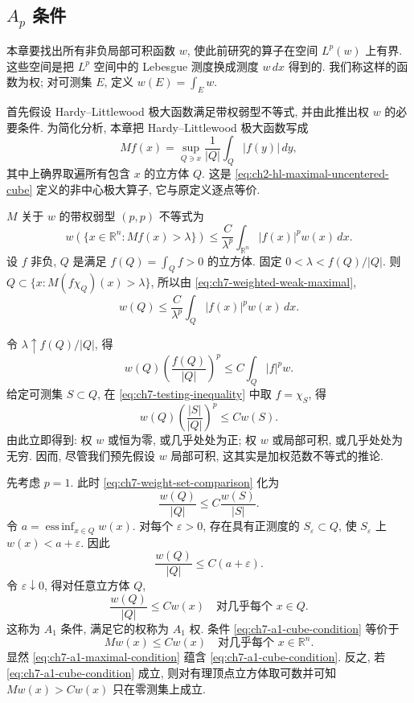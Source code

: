 \hypertarget{chapter-07-page-145}{}
\subsection{$A_p$ 条件}
\label{sec:ch7-ap-condition}

本章要找出所有非负局部可积函数 $w$, 使此前研究的算子在空间 $L^p(w)$ 上有界. 这些空间是把 $L^p$ 空间中的 Lebesgue 测度换成测度 $w\,dx$ 得到的. 我们称这样的函数为权; 对可测集 $E$, 定义 $w(E)=\int_Ew$.

首先假设 Hardy--Littlewood 极大函数满足带权弱型不等式, 并由此推出权 $w$ 的必要条件. 为简化分析, 本章把 Hardy--Littlewood 极大函数写成
\[
 Mf(x)=\sup_{Q\ni x}\frac1{|Q|}\int_Q|f(y)|\,dy,
\]
其中上确界取遍所有包含 $x$ 的立方体 $Q$. 这是 \eqref{eq:ch2-hl-maximal-uncentered-cube} 定义的非中心极大算子, 它与原定义逐点等价.

$M$ 关于 $w$ 的带权弱型 $(p,p)$ 不等式为
\begin{equation}
\label{eq:ch7-weighted-weak-maximal}
 w(\{x\in\mathbb R^n:Mf(x)>\lambda\})
 \le\frac C{\lambda^p}\int_{\mathbb R^n}|f(x)|^pw(x)\,dx.
\end{equation}
设 $f$ 非负, $Q$ 是满足 $f(Q)=\int_Qf>0$ 的立方体. 固定 $0<\lambda<f(Q)/|Q|$. 则 $Q\subset\{x:M(f\chi_Q)(x)>\lambda\}$, 所以由 \eqref{eq:ch7-weighted-weak-maximal},
\[
 w(Q)\le\frac C{\lambda^p}\int_Q|f(x)|^pw(x)\,dx.
\]

\hypertarget{chapter-07-page-146}{}
令 $\lambda\uparrow f(Q)/|Q|$, 得
\begin{equation}
\label{eq:ch7-testing-inequality}
 w(Q)\left(\frac{f(Q)}{|Q|}\right)^p
 \le C\int_Q|f|^pw.
\end{equation}
给定可测集 $S\subset Q$, 在 \eqref{eq:ch7-testing-inequality} 中取 $f=\chi_S$, 得
\begin{equation}
\label{eq:ch7-weight-set-comparison}
 w(Q)\left(\frac{|S|}{|Q|}\right)^p\le Cw(S).
\end{equation}
由此立即得到: 权 $w$ 或恒为零, 或几乎处处为正; 权 $w$ 或局部可积, 或几乎处处为无穷. 因而, 尽管我们预先假设 $w$ 局部可积, 这其实是加权范数不等式的推论.

先考虑 $p=1$. 此时 \eqref{eq:ch7-weight-set-comparison} 化为
\[
 \frac{w(Q)}{|Q|}\le C\frac{w(S)}{|S|}.
\]
令 $a=\operatorname*{ess\,inf}_{x\in Q}w(x)$. 对每个 $\varepsilon>0$, 存在具有正测度的 $S_\varepsilon\subset Q$, 使 $S_\varepsilon$ 上 $w(x)<a+\varepsilon$. 因此
\[
 \frac{w(Q)}{|Q|}\le C(a+\varepsilon).
\]
令 $\varepsilon\downarrow0$, 得对任意立方体 $Q$,
\begin{equation}
\label{eq:ch7-a1-cube-condition}
 \frac{w(Q)}{|Q|}\le Cw(x)
 \quad\text{对几乎每个 }x\in Q.
\end{equation}
这称为 $A_1$ 条件, 满足它的权称为 $A_1$ 权. 条件 \eqref{eq:ch7-a1-cube-condition} 等价于
\begin{equation}
\label{eq:ch7-a1-maximal-condition}
 Mw(x)\le Cw(x)
 \quad\text{对几乎每个 }x\in\mathbb R^n.
\end{equation}
显然 \eqref{eq:ch7-a1-maximal-condition} 蕴含 \eqref{eq:ch7-a1-cube-condition}. 反之, 若 \eqref{eq:ch7-a1-cube-condition} 成立, 则对有理顶点立方体取可数并可知 $Mw(x)>Cw(x)$ 只在零测集上成立.

